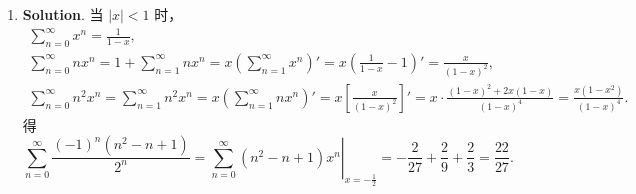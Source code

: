 \documentclass[../main.tex]{subfiles}
\begin{document}
\begin{enumerate}
  \item \textbf{Solution}. 当 \(|x|<1\) 时，
        \[
          \begin{gathered}
            \sum_{n=0}^{\infty}x^n=\frac{1}{1-x},\\
            \sum_{n=0}^{\infty}nx^n=1+\sum_{n=1}^{\infty}nx^n=x\left(\sum_{n=1}^{\infty}x^{n}\right)'=x\left(\frac{1}{1-x}-1\right)'=\frac{x}{(1-x)^2},\\
            \sum_{n=0}^{\infty}n^2x^n=\sum_{n=1}^{\infty}n^2 x^n=x\left(\sum_{n=1}^{\infty}n x^{n}\right)'=x\left[\frac{x}{(1-x)^2}\right]'=x\cdot\frac{(1-x)^2+2x(1-x)}{(1-x)^4}=\frac{x(1-x^2)}{(1-x)^4}.
          \end{gathered}
        \]
        得
        \[
          \sum_{n=0}^{\infty}\frac{(-1)^n(n^2-n+1)}{2^n}
          =\left.\sum_{n=0}^{\infty}(n^2-n+1)x^n\right|_{x=-\frac{1}{2}}
          =-\frac{2}{27}+\frac{2}{9}+\frac{2}{3}
          =\frac{22}{27}.
        \]

\end{enumerate}
\end{document}
